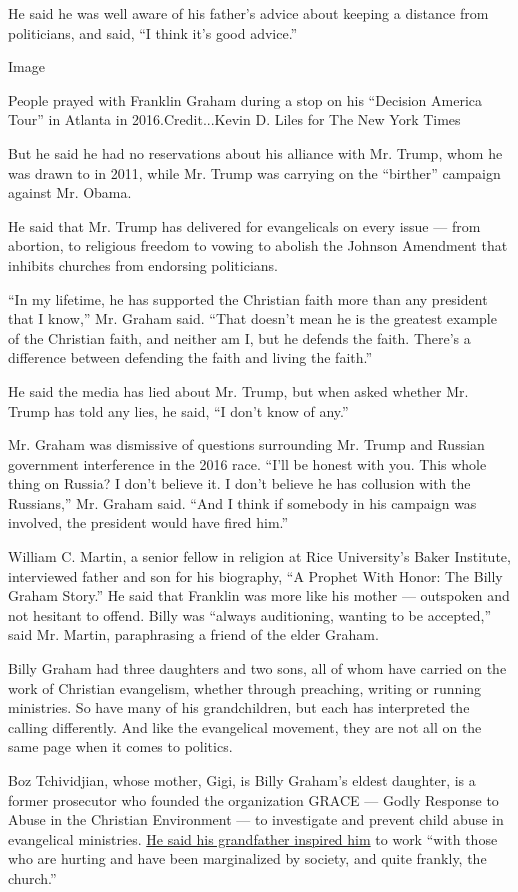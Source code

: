 He said he was well aware of his father's advice about keeping a
distance from politicians, and said, ``I think it's good advice.''

Image

People prayed with Franklin Graham during a stop on his ``Decision
America Tour'' in Atlanta in 2016.Credit...Kevin D. Liles for The New
York Times

But he said he had no reservations about his alliance with Mr. Trump,
whom he was drawn to in 2011, while Mr. Trump was carrying on the
``birther'' campaign against Mr. Obama.

He said that Mr. Trump has delivered for evangelicals on every issue ---
from abortion, to religious freedom to vowing to abolish the Johnson
Amendment that inhibits churches from endorsing politicians.

``In my lifetime, he has supported the Christian faith more than any
president that I know,'' Mr. Graham said. ``That doesn't mean he is the
greatest example of the Christian faith, and neither am I, but he
defends the faith. There's a difference between defending the faith and
living the faith.''

He said the media has lied about Mr. Trump, but when asked whether Mr.
Trump has told any lies, he said, ``I don't know of any.''

Mr. Graham was dismissive of questions surrounding Mr. Trump and Russian
government interference in the 2016 race. ``I'll be honest with you.
This whole thing on Russia? I don't believe it. I don't believe he has
collusion with the Russians,'' Mr. Graham said. ``And I think if
somebody in his campaign was involved, the president would have fired
him.''

William C. Martin, a senior fellow in religion at Rice University's
Baker Institute, interviewed father and son for his biography, ``A
Prophet With Honor: The Billy Graham Story.'' He said that Franklin was
more like his mother --- outspoken and not hesitant to offend. Billy was
``always auditioning, wanting to be accepted,'' said Mr. Martin,
paraphrasing a friend of the elder Graham.

Billy Graham had three daughters and two sons, all of whom have carried
on the work of Christian evangelism, whether through preaching, writing
or running ministries. So have many of his grandchildren, but each has
interpreted the calling differently. And like the evangelical movement,
they are not all on the same page when it comes to politics.

Boz Tchividjian, whose mother, Gigi, is Billy Graham's eldest daughter,
is a former prosecutor who founded the organization GRACE --- Godly
Response to Abuse in the Christian Environment --- to investigate and
prevent child abuse in evangelical ministries.
\href{https://www.washingtonpost.com/news/acts-of-faith/wp/2018/02/21/my-grandfather-billy-graham-was-my-hero/?utm_term=.b64df1e5742a}{He
said his grandfather inspired him} to work ``with those who are hurting
and have been marginalized by society, and quite frankly, the church.''


